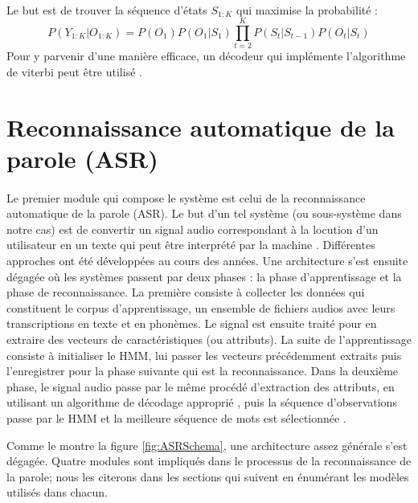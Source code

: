 \paragraph{}
Le but est de trouver la séquence d'états $S_{1:K}$ qui maximise la probabilité \citep{hmm_intro} : 
\begin{equation}
P(Y_{1:K} | O_{1:K}) = P(O_1)P(O_1|S_1)\prod_{t=2}^{K}P(S_t|S_{t-1})P(O_t|S_t) 
\end{equation}
Pour y parvenir d'une manière efficace, un décodeur qui implémente l'algorithme de viterbi peut être utilisé \citep{viterbi,viterbi_hmm}.

\section{Reconnaissance automatique de la parole (ASR)}
\paragraph{}
Le premier module qui compose le système est celui de la reconnaissance automatique de la parole (ASR). Le but d'un tel système (ou sous-système dans notre cas) est de convertir un signal audio correspondant à la locution d'un utilisateur en un texte qui peut être interprété par la machine \citep{asr_definition}. Différentes approches ont été développées au cours des années. Une architecture s'est ensuite dégagée où les systèmes passent par deux phases : la phase d'apprentissage et la phase de reconnaissance. La première consiste à collecter les données qui constituent le corpus d'apprentissage, un ensemble de fichiers audios avec leurs transcriptions en texte et en phonèmes. Le signal est ensuite traité pour en extraire des vecteurs de caractéristiques (ou attributs). La suite de l'apprentissage consiste à initialiser le HMM, lui passer les vecteurs précédemment extraits puis l'enregistrer pour la phase suivante qui est la reconnaissance. Dans la deuxième phase, le signal audio passe par le même procédé d'extraction des attributs, en utilisant un algorithme de décodage approprié \citep{viterbi_hmm}, puis la séquence d'observations passe par le HMM et la meilleure séquence de mots est sélectionnée \citep{speech_reco_Yu2015}.
\par 
Comme le montre la figure \ref{fig:ASRSchema}, une architecture assez générale s'est dégagée. Quatre modules sont impliqués dans le processus de la reconnaissance de la parole; nous les citerons dans les sections qui suivent en énumérant les modèles utilisés dans chacun.

